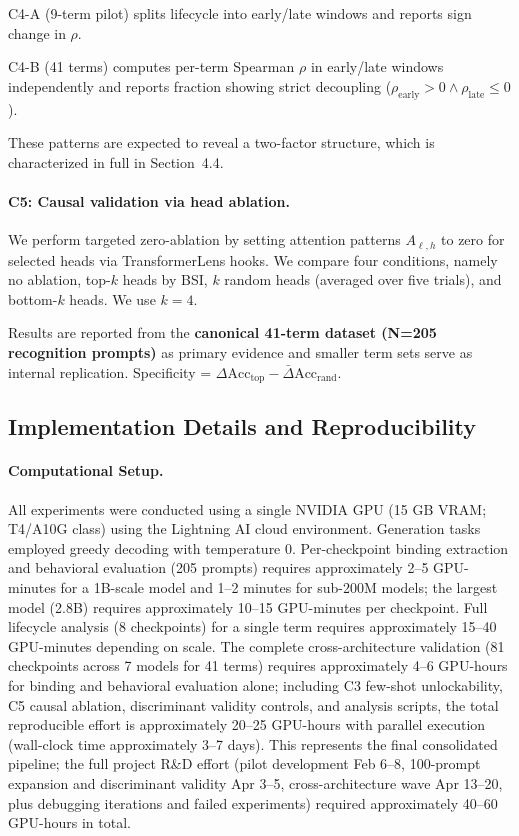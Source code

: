 \documentclass[10pt]{article} %
\begin{document}
C4-A (9-term pilot) splits lifecycle into early/late windows and reports sign change in $\rho$.

C4-B (41 terms) computes per-term Spearman $\rho$ in early/late windows independently and reports fraction showing strict decoupling ($\rho_\text{early} > 0 \land \rho_\text{late} \leq 0$).

These patterns are expected to reveal a two-factor structure, which is characterized in full in Section~4.4.

\paragraph{C5: Causal validation via head ablation.}

We perform targeted zero-ablation by setting attention patterns $A_{\ell,h}$ to zero for selected heads via TransformerLens hooks. We compare four conditions, namely no ablation, top-$k$ heads by BSI, $k$ random heads (averaged over five trials), and bottom-$k$ heads.
We use $k=4$.

Results are reported from the \textbf{canonical 41-term dataset (N=205 recognition prompts)} as primary evidence and smaller term sets serve as internal replication.
Specificity = $\Delta\text{Acc}_\text{top} - \bar{\Delta}\text{Acc}_\text{rand}$.

\subsection{Implementation Details and Reproducibility}

\paragraph{Computational Setup.}
All experiments were conducted using a single NVIDIA GPU (15 GB VRAM; T4/A10G class) using the Lightning AI cloud environment. Generation tasks employed greedy decoding with temperature 0.
Per-checkpoint binding extraction and behavioral evaluation (205 prompts) requires approximately 2--5 GPU-minutes for a 1B-scale model and 1--2 minutes for sub-200M models; the largest model (2.8B) requires approximately 10--15 GPU-minutes per checkpoint. Full lifecycle analysis (8 checkpoints) for a single term requires approximately 15--40 GPU-minutes depending on scale. The complete cross-architecture validation (81 checkpoints across 7 models for 41 terms) requires approximately 4--6 GPU-hours for binding and behavioral evaluation alone; including C3 few-shot unlockability, C5 causal ablation, discriminant validity controls, and analysis scripts, the total reproducible effort is approximately 20--25 GPU-hours with parallel execution (wall-clock time approximately 3--7 days). This represents the final consolidated pipeline; the full project R\&D effort (pilot development Feb 6--8, 100-prompt expansion and discriminant validity Apr 3--5, cross-architecture wave Apr 13--20, plus debugging iterations and failed experiments) required approximately 40--60 GPU-hours in total.
\end{document}
